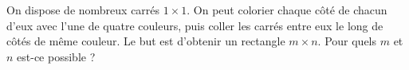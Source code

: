 On dispose de nombreux carrés $1 \times 1$. On peut colorier chaque côté de chacun d'eux avec l'une de quatre couleurs, puis coller les carrés entre eux le long de côtés de même couleur. Le but est d'obtenir un rectangle $m \times n$. Pour quels $m$ et $n$ est-ce possible ?
